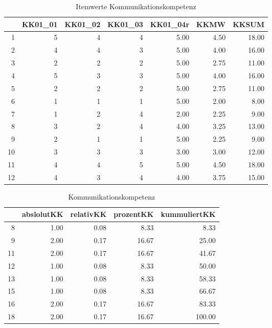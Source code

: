 \begin{table}[ht]
\centering
\caption{Itemwerte Kommunikationskompetenz}
\begin{tabular}{rrrrrrr}
  \hline
 & KK01\_01 & KK01\_02 & KK01\_03 & KK01\_04r & KKMW & KKSUM \\
  \hline
1 &   5 &   4 &   4 & 5.00 & 4.50 & 18.00 \\
  2 &   4 &   4 &   3 & 5.00 & 4.00 & 16.00 \\
  3 &   2 &   2 &   2 & 5.00 & 2.75 & 11.00 \\
  4 &   5 &   3 &   3 & 5.00 & 4.00 & 16.00 \\
  5 &   2 &   2 &   2 & 5.00 & 2.75 & 11.00 \\
  6 &   1 &   1 &   1 & 5.00 & 2.00 & 8.00 \\
  7 &   1 &   2 &   4 & 2.00 & 2.25 & 9.00 \\
  8 &   3 &   2 &   4 & 4.00 & 3.25 & 13.00 \\
  9 &   2 &   1 &   1 & 5.00 & 2.25 & 9.00 \\
  10 &   3 &   3 &   3 & 3.00 & 3.00 & 12.00 \\
  11 &   4 &   4 &   5 & 5.00 & 4.50 & 18.00 \\
  12 &   4 &   3 &   4 & 4.00 & 3.75 & 15.00 \\
   \hline
\end{tabular}
\end{table}

\begin{table}[ht]
\centering
\caption{Kommunikationskompetenz}
\begin{tabular}{rrrrr}
  \hline
 & abslolutKK & relativKK & prozentKK & kummuliertKK \\
  \hline
8 & 1.00 & 0.08 & 8.33 & 8.33 \\
  9 & 2.00 & 0.17 & 16.67 & 25.00 \\
  11 & 2.00 & 0.17 & 16.67 & 41.67 \\
  12 & 1.00 & 0.08 & 8.33 & 50.00 \\
  13 & 1.00 & 0.08 & 8.33 & 58.33 \\
  15 & 1.00 & 0.08 & 8.33 & 66.67 \\
  16 & 2.00 & 0.17 & 16.67 & 83.33 \\
  18 & 2.00 & 0.17 & 16.67 & 100.00 \\
   \hline
\end{tabular}
\end{table}
